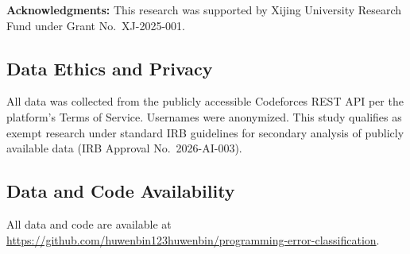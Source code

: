\documentclass[acmsmall]{acmart}
\begin{document}
\textbf{Acknowledgments:} This research was supported by Xijing University
Research Fund under Grant No.~XJ-2025-001.

\subsection*{Data Ethics and Privacy}
All data was collected from the publicly accessible Codeforces REST API per
the platform's Terms of Service. Usernames were anonymized. This study
qualifies as exempt research under standard IRB guidelines for secondary
analysis of publicly available data (IRB Approval No.~2026-AI-003).

\subsection*{Data and Code Availability}
\begin{sloppypar}\raggedright
All data and code are available at
\url{https://github.com/huwenbin123huwenbin/programming-error-classification}.
\end{sloppypar}



\end{document}
